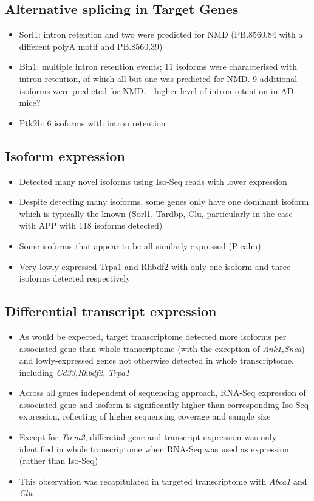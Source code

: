 \subsection{Alternative splicing in Target Genes}
\begin{itemize}
	\item Sorl1: intron retention and two were predicted for NMD (PB.8560.84 with a different polyA motif and PB.8560.39)
	\item Bin1: multiple intron retention events; 11 isoforms were characterised with intron retention, of which all but one was predicted for NMD. 9 additional isoforms were predicted for NMD. - higher level of intron retention in AD mice?
	\item Ptk2b: 6 isoforms with intron retention
\end{itemize}


\subsection{Isoform expression}
\begin{itemize}
	\item Detected many novel isoforms using Iso-Seq reads with lower expression
	\item Despite detecting many isoforms, some genes only have one dominant isoform which is typically the known (Sorl1, Tardbp, Clu, particularly in the case with APP with 118 isoforms detected)
	\item Some isoforms that appear to be all similarly expressed (Picalm)
	\item Very lowly expressed Trpa1 and Rhbdf2 with only one isoform and three isoforms detected respectively
\end{itemize}

\subsection{Differential transcript expression}

\begin{itemize}
	\item As would be expected, target transcriptome detected more isoforms per associated gene than whole transcriptome (with the exception of \textit{Ank1,Snca}) and lowly-expressed genes not otherwise detected in whole transcriptome, including \textit{Cd33},\textit{Rhbdf2}, \textit{Trpa1}
	\item Across all genes independent of sequencing approach, RNA-Seq expression of associated gene and isoform is significantly higher than corresponding Iso-Seq expression, reflecting of higher sequencing coverage and sample size 
	\item Except for \textit{Trem2}, differetial gene and transcript expression was only identified in whole transcriptome when RNA-Seq was used as expression (rather than Iso-Seq)
	\item This observation was recapitulated in targeted transcriptome with \textit{Abca1} and \textit{Clu}
\end{itemize}

